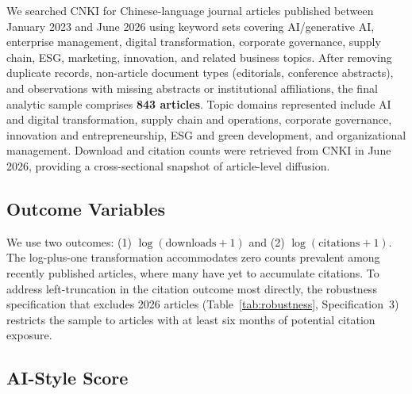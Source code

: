 \documentclass[12pt,a4paper]{article}
\begin{document}
We searched CNKI for Chinese-language journal articles published
between January 2023 and June 2026 using keyword sets covering
AI/generative AI, enterprise management, digital transformation,
corporate governance, supply chain, ESG, marketing, innovation,
and related business topics.
After removing duplicate records, non-article document types
(editorials, conference abstracts), and observations with missing
abstracts or institutional affiliations, the final analytic sample
comprises \textbf{843 articles}.
Topic domains represented include AI and digital transformation,
supply chain and operations, corporate governance, innovation and
entrepreneurship, ESG and green development, and organizational
management.
Download and citation counts were retrieved from CNKI in June 2026,
providing a cross-sectional snapshot of article-level diffusion.

\subsection{Outcome Variables}

We use two outcomes: (1) $\log(\text{downloads}+1)$ and
(2) $\log(\text{citations}+1)$.
The log-plus-one transformation accommodates zero counts prevalent
among recently published articles, where many have yet to accumulate
citations.
To address left-truncation in the citation outcome most directly,
the robustness specification that excludes 2026 articles
(Table~\ref{tab:robustness}, Specification~3) restricts the sample
to articles with at least six months of potential citation exposure.

\subsection{AI-Style Score}
\end{document}
